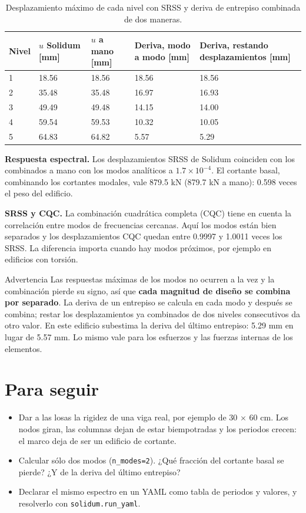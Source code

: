 \documentclass[11pt,oneside]{report}
\begin{document}
\begin{table}[h]
\centering
\caption{Desplazamiento máximo de cada nivel con SRSS y deriva de entrepiso combinada de dos maneras.}
\begin{tabularx}{\textwidth}{YYYYY}
\hline
\textbf{Nivel} & \textbf{$u$ Solidum [mm]} & \textbf{$u$ a mano [mm]} & \textbf{Deriva, modo a modo [mm]} & \textbf{Deriva, restando desplazamientos [mm]} \\
 & 18.56 & 18.56 & 18.56 & 18.56 \\
2 & 35.48 & 35.48 & 16.97 & 16.93 \\
3 & 49.49 & 49.48 & 14.15 & 14.00 \\
4 & 59.54 & 59.53 & 10.32 & 10.05 \\
5 & 64.83 & 64.82 & 5.57 & 5.29 \\
\hline
\end{tabularx}
\end{table}
\textbf{Respuesta espectral.} Los desplazamientos SRSS de Solidum coinciden con los combinados a mano con los modos analíticos a $1.7\times 10^{-4}$. El cortante basal, combinando los cortantes modales, vale 879.5 kN (879.7 kN a mano): 0.598 veces el peso del edificio.

\textbf{SRSS y CQC.} La combinación cuadrática completa (CQC) tiene en cuenta la correlación entre modos de frecuencias cercanas. Aquí los modos están bien separados y los desplazamientos CQC quedan entre 0.9997 y 1.0011 veces los SRSS. La diferencia importa cuando hay modos próximos, por ejemplo en edificios con torsión.

\begin{warnbox}{Advertencia}
Las respuestas máximas de los modos no ocurren a la vez y la combinación pierde su signo, así que \textbf{cada magnitud de diseño se combina por separado}. La deriva de un entrepiso se calcula en cada modo y después se combina; restar los desplazamientos ya combinados de dos niveles consecutivos da otro valor. En este edificio subestima la deriva del último entrepiso: 5.29 mm en lugar de 5.57 mm. Lo mismo vale para los esfuerzos y las fuerzas internas de los elementos.
\end{warnbox}

\section{Para seguir}

\begin{itemize}
  \item Dar a las losas la rigidez de una viga real, por ejemplo de 30 \ensuremath{\times} 60 cm. Los nodos giran, las columnas dejan de estar biempotradas y los periodos crecen: el marco deja de ser un edificio de cortante.
  \item Calcular sólo dos modos (\texttt{n\_modes=2}). ¿Qué fracción del cortante basal se pierde? ¿Y de la deriva del último entrepiso?
  \item Declarar el mismo espectro en un YAML como tabla de periodos y valores, y resolverlo con \texttt{solidum.run\_yaml}.
\end{itemize}
\end{document}
